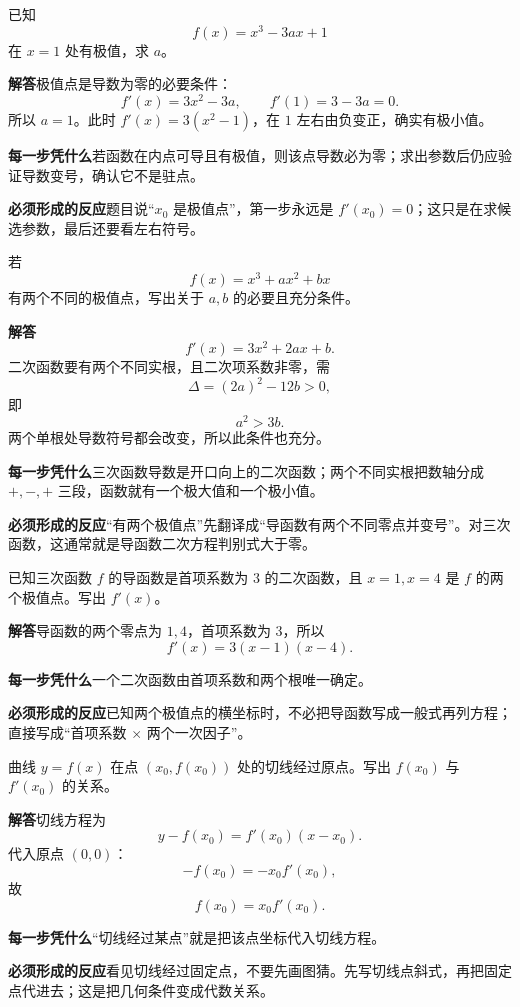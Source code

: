 \documentclass[11pt,fontset=fandol]{ctexart}
\newcommand{\answer}{\par\textbf{解答}\quad}
\newcommand{\basis}{\par\textbf{每一步凭什么}\quad}
\newcommand{\reaction}{\par\textbf{必须形成的反应}\quad}
\newenvironment{drill}[2]{
  \begin{tcolorbox}[colback=white,colframe=black!35,title={#1\quad\small #2},breakable]
}{\end{tcolorbox}}
\begin{document}
\begin{drill}{29. 极值点条件先给出参数方程}{项目导数题库改编}
已知
\[
f(x)=x^3-3ax+1
\]
在 $x=1$ 处有极值，求 $a$。

\answer 极值点是导数为零的必要条件：
\[
f'(x)=3x^2-3a,\qquad f'(1)=3-3a=0.
\]
所以 $a=1$。此时 $f'(x)=3(x^2-1)$，在 $1$ 左右由负变正，确实有极小值。

\basis 若函数在内点可导且有极值，则该点导数必为零；求出参数后仍应验证导数变号，确认它不是驻点。

\reaction 题目说“$x_0$ 是极值点”，第一步永远是 $f'(x_0)=0$；这只是在求候选参数，最后还要看左右符号。
\end{drill}

\begin{drill}{30. 两个极值点意味着导函数至少有两个变号零点}{项目导数题库改编}
若
\[
f(x)=x^3+ax^2+bx
\]
有两个不同的极值点，写出关于 $a,b$ 的必要且充分条件。

\answer
\[
f'(x)=3x^2+2ax+b.
\]
二次函数要有两个不同实根，且二次项系数非零，需
\[
\Delta=(2a)^2-12b>0,
\]
即
\[
a^2>3b.
\]
两个单根处导数符号都会改变，所以此条件也充分。

\basis 三次函数导数是开口向上的二次函数；两个不同实根把数轴分成 $+,-,+$ 三段，函数就有一个极大值和一个极小值。

\reaction “有两个极值点”先翻译成“导函数有两个不同零点并变号”。对三次函数，这通常就是导函数二次方程判别式大于零。
\end{drill}

\begin{drill}{31. 已知极值点横坐标，可用导函数因式分解}{项目导数题库改编}
已知三次函数 $f$ 的导函数是首项系数为 $3$ 的二次函数，且 $x=1,x=4$ 是 $f$ 的两个极值点。写出 $f'(x)$。

\answer 导函数的两个零点为 $1,4$，首项系数为 $3$，所以
\[
f'(x)=3(x-1)(x-4).
\]

\basis 一个二次函数由首项系数和两个根唯一确定。

\reaction 已知两个极值点的横坐标时，不必把导函数写成一般式再列方程；直接写成“首项系数 $\times$ 两个一次因子”。
\end{drill}

\begin{drill}{32. 切线经过原点给出的是 $f(x_0)=x_0f'(x_0)$}{项目导数题库改编}
曲线 $y=f(x)$ 在点 $(x_0,f(x_0))$ 处的切线经过原点。写出 $f(x_0)$ 与 $f'(x_0)$ 的关系。

\answer 切线方程为
\[
y-f(x_0)=f'(x_0)(x-x_0).
\]
代入原点 $(0,0)$：
\[
-f(x_0)=-x_0f'(x_0),
\]
故
\[
f(x_0)=x_0f'(x_0).
\]

\basis “切线经过某点”就是把该点坐标代入切线方程。

\reaction 看见切线经过固定点，不要先画图猜。先写切线点斜式，再把固定点代进去；这是把几何条件变成代数关系。
\end{drill}
\end{document}
